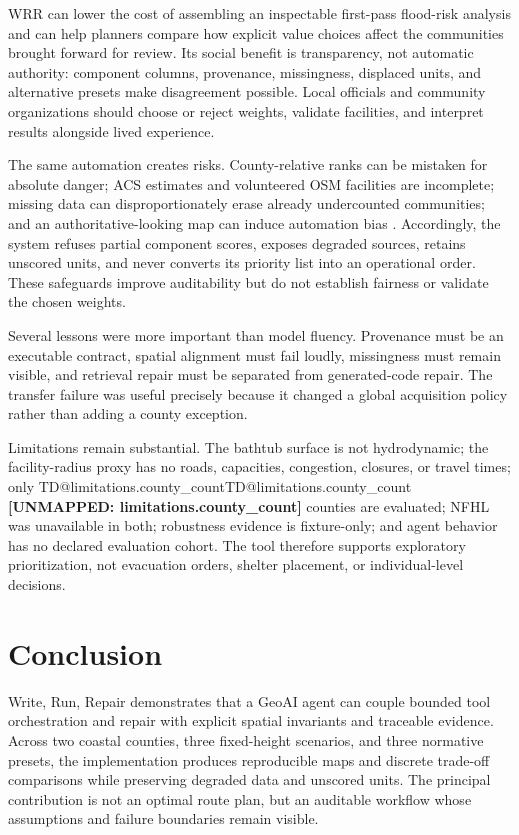 \documentclass[sigconf,nonacm]{acmart}
\makeatletter
\newcommand{\TD}[1]{%
  \ifcsname TD@#1\endcsname\csname TD@#1\endcsname%
  \else\textbf{[UNMAPPED: #1]}\fi%
}
\makeatother
\begin{document}
WRR can lower the cost of assembling an inspectable first-pass flood-risk
analysis and can help planners compare how explicit value choices affect the
communities brought forward for review. Its social benefit is transparency, not
automatic authority: component columns, provenance, missingness, displaced
units, and alternative presets make disagreement possible. Local officials and
community organizations should choose or reject weights, validate facilities,
and interpret results alongside lived experience.

The same automation creates risks. County-relative ranks can be mistaken for
absolute danger; ACS estimates and volunteered OSM facilities are incomplete;
missing data can disproportionately erase already undercounted communities; and
an authoritative-looking map can induce automation bias \cite{gevaert2021}.
Accordingly, the system refuses partial component scores, exposes degraded
sources, retains unscored units, and never converts its priority list into an
operational order. These safeguards improve auditability but do not establish
fairness or validate the chosen weights.

Several lessons were more important than model fluency. Provenance must be an
executable contract, spatial alignment must fail loudly, missingness must remain
visible, and retrieval repair must be separated from generated-code repair. The
transfer failure was useful precisely because it changed a global acquisition
policy rather than adding a county exception.

Limitations remain substantial. The bathtub surface is not hydrodynamic; the
facility-radius proxy has no roads, capacities, congestion, closures, or travel
times; only \TD{limitations.county_count} counties are evaluated; NFHL was
unavailable in both; robustness evidence is fixture-only; and agent behavior has
no declared evaluation cohort. The tool therefore supports exploratory
prioritization, not evacuation orders, shelter placement, or individual-level
decisions.

\section{Conclusion}

Write, Run, Repair demonstrates that a GeoAI agent can couple bounded tool
orchestration and repair with explicit spatial invariants and traceable evidence.
Across two coastal counties, three fixed-height scenarios, and three normative
presets, the implementation produces reproducible maps and discrete trade-off
comparisons while preserving degraded data and unscored units. The principal
contribution is not an optimal route plan, but an auditable workflow whose
assumptions and failure boundaries remain visible.



\end{document}

